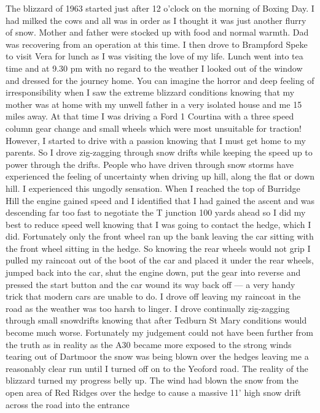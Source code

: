The blizzard of 1963 started just after 12 o'clock on the morning of Boxing Day.
I had milked the cows and all was in order as I thought it was just another
flurry of snow. Mother and father were stocked up with food and normal warmth.
Dad was recovering from an operation at this time. I then drove to Brampford
Speke to visit Vera for lunch as I was visiting the love of my life. Lunch went
into tea time and at 9.30 pm with no regard to the weather I looked out of the
window and dressed for the journey home. You can imagine the horror and deep
feeling of irresponsibility when I saw the extreme blizzard conditions knowing
that my mother was at home with my unwell father in a very isolated house and
me 15 miles away. At that time I was driving a Ford 1 Courtina with a three
speed column gear change and small wheels which were most unsuitable for
traction! However, I started to drive with a passion knowing that I must get
home to my parents. So I drove zig-zagging through snow drifts while keeping
the speed up to power through the drifts. People who have driven through snow
storms have experienced the feeling of uncertainty when driving up hill, along
the flat or down hill. I experienced this ungodly sensation. When I reached the
top of Burridge Hill the engine gained speed and I identified that I had gained
the ascent and was descending far too fast to negotiate the T junction 100
yards ahead so I did my best to reduce speed well knowing that I was going to
contact the hedge, which I did. Fortunately only the front wheel ran up the
bank leaving the car sitting with the front wheel sitting in the hedge. So
knowing the rear wheels would not grip I pulled my raincoat out of the boot of
the car and placed it under the rear wheels, jumped back into the car, shut the
engine down, put the gear into reverse and pressed the start button and the car
wound its way back off --- a very handy trick that modern cars are unable to
do. I drove off leaving my raincoat in the road as the weather was too harsh to
linger. I drove continually zig-zagging through small snowdrifts knowing that
after Tedburn St Mary conditions would become much worse. Fortunately my
judgement could not have been further from the truth as in reality as the A30
became more exposed to the strong winds tearing out of Dartmoor the snow was
being blown over the hedges leaving me a reasonably clear run until I turned
off on to the Yeoford road. The reality of the blizzard turned my progress
belly up. The wind had blown the snow from the open area of Red Ridges over the
hedge to cause a massive 11' high snow drift across the road into the entrance
